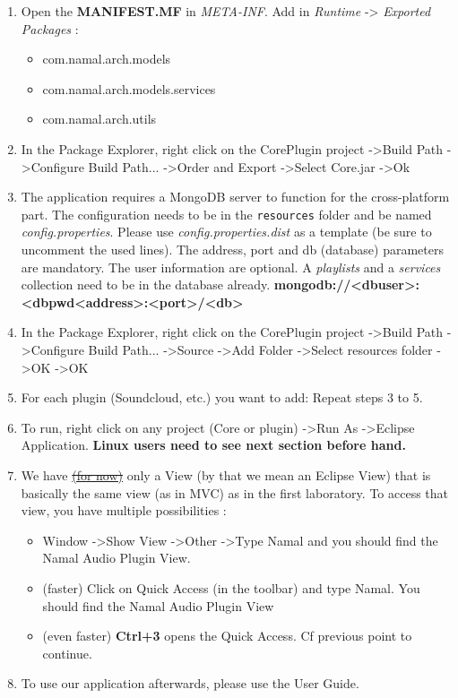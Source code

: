 \documentclass{report}
\begin{document}
{\begin{enumerate}
\item Open the \textbf{MANIFEST.MF} in \textit{META-INF}. Add in \textit{Runtime} -\textgreater \textit{ Exported Packages} : 
\begin{itemize}
\item com.namal.arch.models
\item com.namal.arch.models.services
\item com.namal.arch.utils
\end{itemize}
\item In the Package Explorer, right click on the CorePlugin project -\textgreater Build Path -\textgreater Configure Build Path... -\textgreater Order and Export -\textgreater Select Core.jar -\textgreater Ok
\item The application requires a MongoDB server to function for the cross-platform part. The configuration needs to be in the \texttt{resources} folder and be named \textit{config.properties}. Please use \textit{config.properties.dist} as a template (be sure to uncomment the used lines). The address, port and db (database) parameters are mandatory. The user information are optional. A \textit{playlists} and a \textit{services} collection need to be in the database already. \textbf{mongodb://\textless dbuser\textgreater:\textless dbpwd\textgreater@\textless address\textgreater:\textless port\textgreater/\textless db\textgreater}
\item In the Package Explorer, right click on the CorePlugin project -\textgreater Build Path -\textgreater Configure Build Path... -\textgreater Source -\textgreater Add Folder -\textgreater Select resources folder -\textgreater OK -\textgreater OK
\item For each plugin (Soundcloud, etc.) you want to add: Repeat steps 3 to 5.
\item To run, right click on any project (Core or plugin) -\textgreater Run As -\textgreater Eclipse Application. \textbf{Linux users need to see next section before hand.}
\item We have \sout{\hyperref[lim::toolbar]{(for now)}} only a View (by that we mean an Eclipse View) that is basically the same view (as in MVC) as in the first laboratory. To access that view, you have multiple possibilities :
\begin{itemize}
\item Window -\textgreater Show View -\textgreater Other -\textgreater Type Namal and you should find the Namal Audio Plugin View.
\item (faster) Click on Quick Access (in the toolbar) and type Namal. You should find the Namal Audio Plugin View
\item (even faster) \textbf{Ctrl+3} opens the Quick Access. Cf previous point to continue.
\end{itemize}
\item To use our application afterwards, please use the User Guide.


\end{enumerate}}
\end{document}
